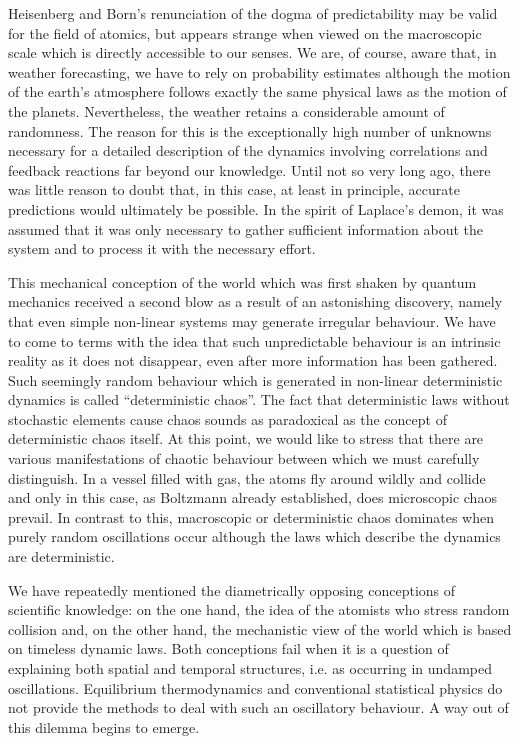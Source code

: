 \documentclass[12pt]{article}
\begin{document}
\hfill

Heisenberg and Born’s renunciation of the dogma of predictability may be valid
for the field of atomics, but appears strange when viewed on the macroscopic scale
which is directly accessible to our senses. We are, of course, aware that, in weather
forecasting, we have to rely on probability estimates although the motion of the
earth’s atmosphere follows exactly the same physical laws as the motion of the
planets. Nevertheless, the weather retains a considerable amount of randomness.
The reason for this is the exceptionally high number of unknowns necessary for a
detailed description of the dynamics involving correlations and feedback reactions
far beyond our knowledge. Until not so very long ago, there was little reason to
doubt that, in this case, at least in principle, accurate predictions would ultimately
be possible. In the spirit of Laplace’s demon, it was assumed that it was only necessary
to gather sufficient information about the system and to process it with the
necessary effort.

\hfill

This mechanical conception of the world which was first shaken by quantum mechanics
received a second blow as a result of an astonishing discovery, namely that
even simple non-linear systems may generate irregular behaviour. We have to come
to terms with the idea that such unpredictable behaviour is an intrinsic reality as it
does not disappear, even after more information has been gathered. Such seemingly
random behaviour which is generated in non-linear deterministic dynamics is called
“deterministic chaos”. The fact that deterministic laws without stochastic elements
cause chaos sounds as paradoxical as the concept of deterministic chaos itself. At
this point, we would like to stress that there are various manifestations of chaotic
behaviour between which we must carefully distinguish. In a vessel filled with gas,
the atoms fly around wildly and collide and only in this case, as Boltzmann already
established, does microscopic chaos prevail. In contrast to this, macroscopic or deterministic
chaos dominates when purely random oscillations occur although the
laws which describe the dynamics are deterministic.

\hfill

We have repeatedly mentioned the diametrically opposing conceptions of scientific
knowledge: on the one hand, the idea of the atomists who stress random collision
and, on the other hand, the mechanistic view of the world which is based on timeless
dynamic laws. Both conceptions fail when it is a question of explaining both spatial
and temporal structures, i.e. as occurring in undamped oscillations. Equilibrium
thermodynamics and conventional statistical physics do not provide the methods
to deal with such an oscillatory behaviour. A way out of this dilemma begins to
emerge.
\end{document}
